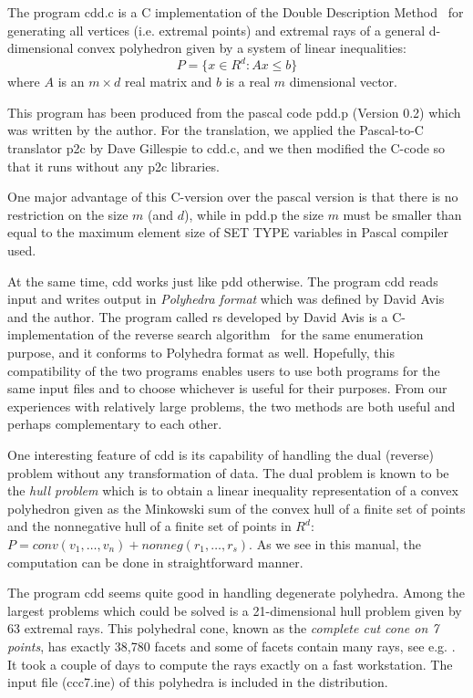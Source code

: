 The program  cdd.c  is a C implementation of 
the Double Description Method~\cite{MRTT}
for generating all vertices (i.e. extremal points)
and extremal rays of a general d-dimensional 
convex polyhedron given by a system of linear inequalities:
\[
   P = \{ x  \in R^d:  A  x  \le  b \}
\]
where $A$ is an $m \times d$ real matrix and $b$ is a real
$m$ dimensional vector. 
 
This program has been produced
from the pascal code pdd.p (Version 0.2)
which was written by the author.   For the translation,
we applied the Pascal-to-C translator p2c
by Dave Gillespie to cdd.c, and we then modified
the C-code so that it runs without any p2c libraries.

One major advantage of this C-version over the pascal version is
that there is no restriction on the size  $m$ (and $d$), while in pdd.p
the size $m$ must be smaller than equal to the maximum element size
of SET TYPE variables in Pascal compiler used.

At the same time, cdd works just like pdd otherwise.
The program cdd reads input and writes output in 
{\em Polyhedra format\/} which was defined by David Avis and
the author.  The program called rs developed by David Avis is
a C-implementation of the reverse search algorithm~\cite{AF} 
for the same enumeration purpose, and it conforms to Polyhedra format as well.
Hopefully, this compatibility of the two programs
enables users to use both programs for the same input files
and to choose whichever is useful for their purposes.
From our experiences with relatively large problems,
the two methods are both useful and perhaps complementary
to each other.

One interesting feature of cdd is its capability
of handling the dual (reverse)  problem without any transformation
of data.  The dual problem is known to be the {\em hull problem\/} which
is to obtain a linear inequality representation
of a convex polyhedron given as the Minkowski sum of 
the convex hull of a finite set of points and the nonnegative
hull of a finite set of points in $R^d$: 
$P = conv(v_1,\ldots,v_n) +  nonneg(r_1,\ldots,r_s)$.
As we see in this manual, the computation can be done
in straightforward manner.

The program cdd seems quite good in handling degenerate
polyhedra.  Among the largest problems which could be
solved is a 21-dimensional hull problem given by 63 
extremal rays. This polyhedral cone, known as the {\em complete
cut cone on 7 points\/}, has exactly 38,780 facets and
some of facets contain many rays, see e.g. \cite{G}. 
It took a couple of days to compute the rays exactly on
a fast workstation.  The input file (ccc7.ine) of this polyhedra is
included in the distribution.

